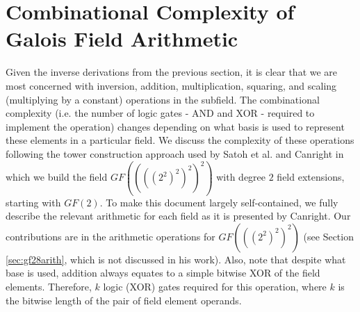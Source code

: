 



\section{Combinational Complexity of Galois Field Arithmetic} \label{sec:ffcomplexity}
Given the inverse derivations from the previous section, it is clear that we are most concerned with inversion, addition, multiplication, squaring, and scaling (multiplying by a constant) operations in the subfield. The combinational complexity (i.e. the number of logic gates - AND and XOR - required to implement the operation) changes depending on what basis is used to represent these elements in a particular field. We discuss the complexity of these operations following the tower construction approach used by Satoh et al. \cite{Satoh01-1} and Canright \cite{Canright05-1} in which we build the field $GF((((2^2)^2)^2)^2)$ with degree $2$ field extensions, starting with $GF(2)$. To make this document largely self-contained, we fully describe the relevant arithmetic for each field as it is presented by Canright. Our contributions are in the arithmetic operations for $GF(((2^2)^2)^2)$ (see Section \ref{sec:gf28arith}, which is not discussed in his work). Also, note that despite what base is used, addition always equates to a simple bitwise XOR of the field elements. Therefore, $k$ logic (XOR) gates required for this operation, where $k$ is the bitwise length of the pair of field element operands.


